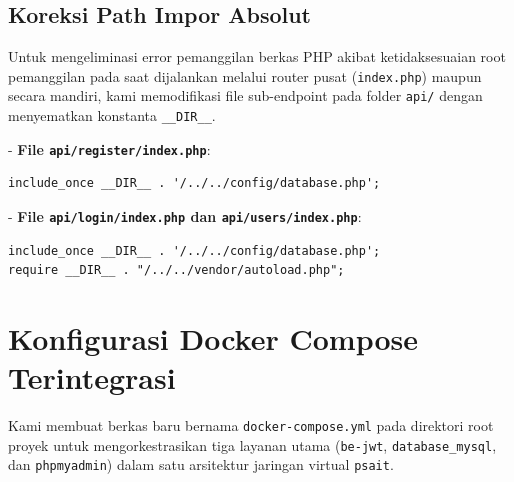 \documentclass[a4paper,oneside,12pt]{report}
\begin{document}
\subsection{Koreksi Path Impor Absolut}
Untuk mengeliminasi error pemanggilan berkas PHP akibat ketidaksesuaian root pemanggilan pada saat dijalankan melalui router pusat (\texttt{index.php}) maupun secara mandiri, kami memodifikasi file sub-endpoint pada folder \texttt{api/} dengan menyematkan konstanta \texttt{\_\_DIR\_\_}.

- \textbf{File \texttt{api/register/index.php}}:
\begin{lstlisting}[style=phpstyle]
include_once __DIR__ . '/../../config/database.php';
\end{lstlisting}

- \textbf{File \texttt{api/login/index.php} dan \texttt{api/users/index.php}}:
\begin{lstlisting}[style=phpstyle]
include_once __DIR__ . '/../../config/database.php';
require __DIR__ . "/../../vendor/autoload.php";
\end{lstlisting}

\section{Konfigurasi Docker Compose Terintegrasi}
Kami membuat berkas baru bernama \texttt{docker-compose.yml} pada direktori root proyek untuk mengorkestrasikan tiga layanan utama (\texttt{be-jwt}, \texttt{database\_mysql}, dan \texttt{phpmyadmin}) dalam satu arsitektur jaringan virtual \texttt{psait}.
\end{document}
